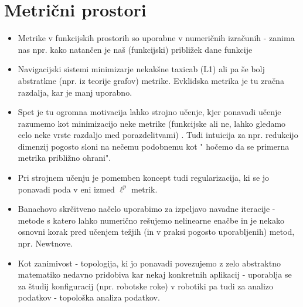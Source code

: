 \documentclass[12pt]{article}
\begin{document}
\section*{Metrični prostori}
\begin{itemize}[leftmargin=1.5em]
    \item Metrike v funkcijskih prostorih so uporabne v numeričnih izračunih - zanima nas npr. kako natančen je naš (funkcijski) približek dane funkcije 
    \item Navigacijski sistemi minimizarje nekakšne taxicab (L1) ali pa še bolj abstratkne (npr. iz teorije grafov) metrike. Evklidska metrika je tu zračna razdalja, kar je manj uporabno.
    \item Spet je tu ogromna motivacija lahko strojno učenje, kjer ponavadi učenje razumemo kot minimizacijo neke metrike (funkcijske ali ne, lahko gledamo celo neke vrste razdaljo med porazdelitvami) . Tudi intuicija za npr. redukcijo dimenzij pogosto sloni na nečemu podobnemu kot "{} hočemo da se primerna metrika približno ohrani"{}. 
    \item Pri strojnem učenju je pomemben koncept tudi regularizacija, ki se jo ponavadi poda v eni izmed $\ell^p$ metrik.
   \item Banachovo skrčitveno načelo uporabimo za izpeljavo navadne iteracije - metode s katero lahko numerično rešujemo nelinearne enačbe in je nekako osnovni korak pred učenjem težjih (in v praksi pogosto uporabljenih) metod, npr. Newtnove.
    \item Kot zanimivost - topologija, ki jo ponavadi povezujemo z zelo abstraktno matematiko nedavno pridobiva kar nekaj konkretnih aplikacij - uporablja se za študij konfiguracij (npr. robotske roke) v robotiki pa tudi za analizo podatkov - topološka analiza podatkov.
\end{itemize}
\end{document}
